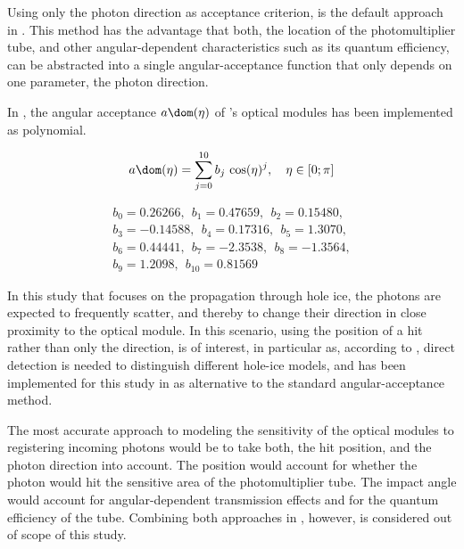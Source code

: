 Using only the photon direction as acceptance criterion, is the default approach in \clsim. This method has the advantage that both, the location of the photomultiplier tube, and other angular-dependent characteristics such as its quantum efficiency, can be abstracted into a single angular-acceptance function that only depends on one parameter, the photon direction.

In \clsim, the angular acceptance $a\dom(\eta)$ of \icecube's optical modules has been implemented as polynomial.

\begin{equation}
  a\dom(\eta) = \sum_{j = 0}^{10} b_j\,\cos(\eta)^j, \ \ \ \eta \in [0; \pi]
  \label{eq:anominal}
\end{equation}

\begin{gather*}
   b_0 =  0.26266,  \ \  b_1    =  0.47659,   \ \ b_2 =  0.15480,  \\
   b_3 = -0.14588,  \ \  b_4    =  0.17316,   \ \ b_5 =  1.3070,   \\
   b_6 =  0.44441,  \ \  b_7    = -2.3538,    \ \ b_8 = -1.3564,   \\
   b_9 =  1.2098,   \ \  b_{10} =  0.81569
\end{gather*}


In this study that focuses on the propagation through hole ice, the photons are expected to frequently scatter, and thereby to change their direction in close proximity to the optical module. In this scenario, using the position of a hit rather than only the direction, is of interest, in particular as, according to \cite{martinspicehddard}, direct detection is needed to distinguish different hole-ice models, and has been implemented for this study in \clsim as alternative to the standard angular-acceptance method.


The most accurate approach to modeling the sensitivity of the optical modules to registering incoming photons would be to take both, the hit position, and the photon direction into account. The position would account for whether the photon would hit the sensitive area of the photomultiplier tube. The impact angle would account for angular-dependent transmission effects and for the quantum efficiency of the tube. Combining both approaches in \clsim, however, is considered out of scope of this study.\followup

